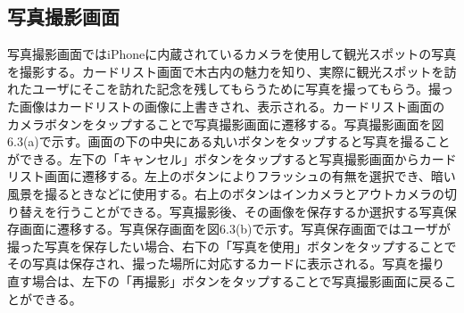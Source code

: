 \subsection{写真撮影画面}
写真撮影画面ではiPhoneに内蔵されているカメラを使用して観光スポットの写真を撮影する。カードリスト画面で木古内の魅力を知り、実際に観光スポットを訪れたユーザにそこを訪れた記念を残してもらうために写真を撮ってもらう。撮った画像はカードリストの画像に上書きされ、表示される。カードリスト画面のカメラボタンをタップすることで写真撮影画面に遷移する。写真撮影画面を図6.3(a)で示す。画面の下の中央にある丸いボタンをタップすると写真を撮ることができる。左下の「キャンセル」ボタンをタップすると写真撮影画面からカードリスト画面に遷移する。左上のボタンによりフラッシュの有無を選択でき、暗い風景を撮るときなどに使用する。右上のボタンはインカメラとアウトカメラの切り替えを行うことができる。写真撮影後、その画像を保存するか選択する写真保存画面に遷移する。写真保存画面を図6.3(b)で示す。写真保存画面ではユーザが撮った写真を保存したい場合、右下の「写真を使用」ボタンをタップすることでその写真は保存され、撮った場所に対応するカードに表示される。写真を撮り直す場合は、左下の「再撮影」ボタンをタップすることで写真撮影画面に戻ることができる。
\newpage

